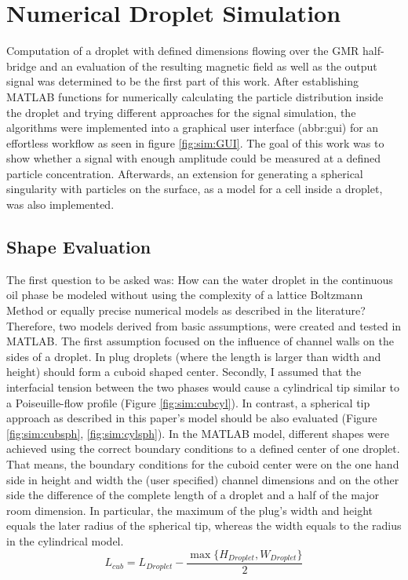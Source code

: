\section{Numerical Droplet Simulation}
Computation of a droplet with defined dimensions flowing over the GMR half-bridge and an evaluation of the resulting magnetic field as well as the output signal was determined to be the first part of this work. After establishing MATLAB functions for numerically calculating the particle distribution inside the droplet and trying different approaches for the signal simulation, the algorithms were implemented into a graphical user interface (\acrshort{abbr:gui}) for an effortless workflow as seen in figure \ref{fig:sim:GUI}. The goal of this work was to show whether a signal with enough amplitude could be measured at a defined particle concentration. Afterwards, an extension for generating a spherical singularity with particles on the surface, as a model for a cell inside a droplet, was also implemented.
\subsection{Shape Evaluation}
\label{sec:sim:shape_eval}
The first question to be asked was: How can the water droplet in the continuous oil phase be modeled without using the complexity of a lattice Boltzmann Method or equally precise numerical models as described in the literature?\cite{lit:fluidics:droplet:simulation:t}\cite{lit:fluidics:droplet:junction:cross} Therefore, two models derived from basic assumptions, were created and tested in MATLAB.
The first assumption focused on the influence of channel walls on the sides of a droplet. In plug droplets (where the length is larger than width and height) should form a cuboid shaped center. Secondly, I assumed that the interfacial tension between the two phases would cause a cylindrical tip similar to a Poiseuille-flow profile (Figure \ref{fig:sim:cubcyl}). In contrast, a spherical tip approach as described in this paper's model should be also evaluated (Figure \ref{fig:sim:cubsph}, \ref{fig:sim:cylsph}).\cite{lit:fluidics:droplet:junction:cross}
\newpage
In the MATLAB model, different shapes were achieved using the correct boundary conditions to a defined center of one droplet.
That means, the boundary conditions for the cuboid center were on the one hand side in height and width the (user specified) channel dimensions and on the other side the difference of the complete length of a droplet and a half of the major room dimension. In particular, the maximum of the plug's width and height equals the later radius of the spherical tip, whereas the width equals to the radius in the cylindrical model.
\begin{equation}
L_{cub} = L_{Droplet} - \frac{\max \{ H_{Droplet},W_{Droplet}\}}{2}
\label{eq:l_cub}
\end{equation}

